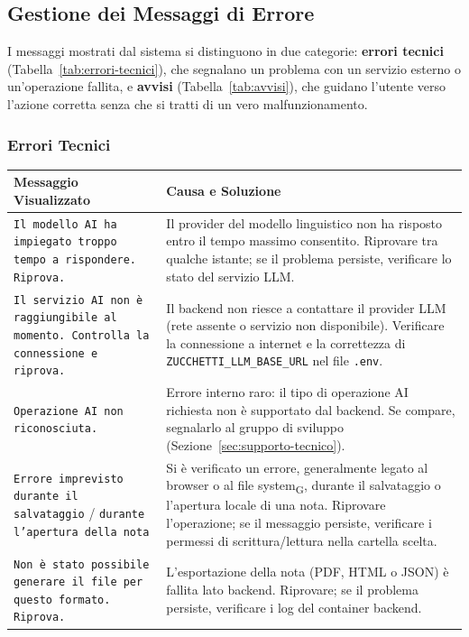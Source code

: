 \subsection{Gestione dei Messaggi di Errore}
I messaggi mostrati dal sistema si distinguono in due categorie: \textbf{errori tecnici} (Tabella~\ref{tab:errori-tecnici}), che 
segnalano un problema con un servizio esterno o un'operazione fallita, e \textbf{avvisi} (Tabella~\ref{tab:avvisi}), che guidano 
l'utente verso l'azione corretta senza che si tratti di un vero malfunzionamento.

\subsubsection{Errori Tecnici}
\renewcommand{\arraystretch}{1.3}
\begin{table}[H]
\begin{tabularx}{\textwidth}{|X|X|}
    \hline
    \rowcolor{primarycolor!10}
    \textbf{Messaggio Visualizzato} & \textbf{Causa e Soluzione} \\
    \hline
    \texttt{Il modello AI ha impiegato troppo tempo a rispondere. Riprova.} & Il provider del modello linguistico non ha risposto entro il tempo massimo consentito. Riprovare tra qualche istante; se il problema persiste, verificare lo stato del servizio LLM. \\
    \hline
    \texttt{Il servizio AI non è raggiungibile al momento. Controlla la connessione e riprova.} & Il backend non riesce a contattare il provider LLM (rete assente o servizio non disponibile). Verificare la connessione a internet e la correttezza di \texttt{ZUCCHETTI\_LLM\_BASE\_URL} nel file \texttt{.env}. \\
    \hline
    \texttt{Operazione AI non riconosciuta.} & Errore interno raro: il tipo di operazione AI richiesta non è supportato dal backend. Se compare, segnalarlo al gruppo di sviluppo (Sezione~\ref{sec:supporto-tecnico}). \\
    \hline
    \texttt{Errore imprevisto durante il salvataggio} / \texttt{durante l'apertura della nota} & Si è verificato un errore, generalmente legato al browser o al file system\textsubscript{G}, durante il salvataggio o l'apertura locale di una nota. Riprovare l'operazione; se il messaggio persiste, verificare i permessi di scrittura/lettura nella cartella scelta. \\
    \hline
    \texttt{Non è stato possibile generare il file per questo formato. Riprova.} & L'esportazione della nota (PDF, HTML o JSON) è fallita lato backend. Riprovare; se il problema persiste, verificare i log del container backend. \\

\end{tabularx}
\end{table}
